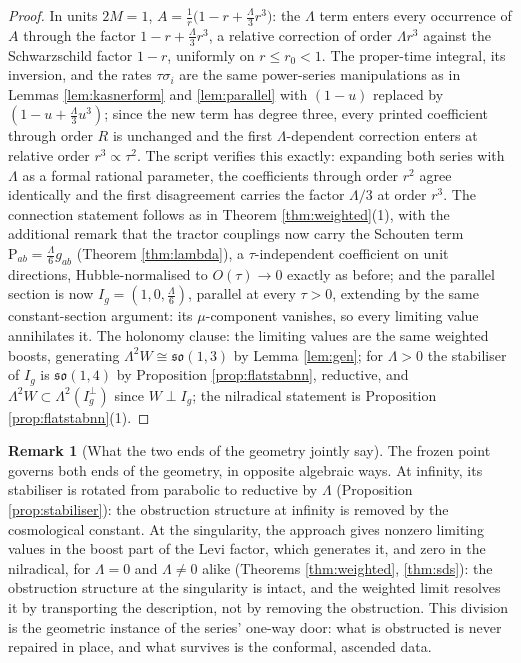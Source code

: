 \documentclass[11pt]{article}
\theoremstyle{definition}
\newtheorem{remark}[theorem]{Remark}
\newcommand{\Sch}{\mathrm{P}}
\begin{document}
\begin{proof}
In units $2M = 1$, $A = \tfrac{1}{r}\bigl(1 - r + \tfrac{\Lambda}{3}r^3\bigr)$: the $\Lambda$ term enters every occurrence of $A$ through the factor $1 - r + \tfrac{\Lambda}{3}r^3$, a relative correction of order $\Lambda r^3$ against the Schwarzschild factor $1 - r$, uniformly on $r \le r_0 < 1$. The proper-time integral, its inversion, and the rates $\tau\sigma_i$ are the same power-series manipulations as in Lemmas \ref{lem:kasnerform} and \ref{lem:parallel} with $(1-u)$ replaced by $(1 - u + \tfrac{\Lambda}{3}u^3)$; since the new term has degree three, every printed coefficient through order $R$ is unchanged and the first $\Lambda$-dependent correction enters at relative order $r^3 \propto \tau^2$. The script verifies this exactly: expanding both series with $\Lambda$ as a formal rational parameter, the coefficients through order $r^{2}$ agree identically and the first disagreement carries the factor $\Lambda/3$ at order $r^3$. The connection statement follows as in Theorem \ref{thm:weighted}(1), with the additional remark that the tractor couplings now carry the Schouten term $\Sch_{ab} = \tfrac{\Lambda}{6}g_{ab}$ (Theorem \ref{thm:lambda}), a $\tau$-independent coefficient on unit directions, Hubble-normalised to $O(\tau) \to 0$ exactly as before; and the parallel section is now $I_g = (1, 0, \tfrac{\Lambda}{6})$, parallel at every $\tau > 0$, extending by the same constant-section argument: its $\mu$-component vanishes, so every limiting value annihilates it. The holonomy clause: the limiting values are the same weighted boosts, generating $\Lambda^2 W \cong \mathfrak{so}(1,3)$ by Lemma \ref{lem:gen}; for $\Lambda > 0$ the stabiliser of $I_g$ is $\mathfrak{so}(1,4)$ by Proposition \ref{prop:flatstabnn}, reductive, and $\Lambda^2 W \subset \Lambda^2(I_g^\perp)$ since $W \perp I_g$; the nilradical statement is Proposition \ref{prop:flatstabnn}(1).
\end{proof}

\begin{remark}[What the two ends of the geometry jointly say]\label{rem:jointly}
The frozen point governs both ends of the geometry, in opposite algebraic ways. At infinity, its stabiliser is rotated from parabolic to reductive by $\Lambda$ (Proposition \ref{prop:stabiliser}): the obstruction structure at infinity is removed by the cosmological constant. At the singularity, the approach gives nonzero limiting values in the boost part of the Levi factor, which generates it, and zero in the nilradical, for $\Lambda = 0$ and $\Lambda \neq 0$ alike (Theorems \ref{thm:weighted}, \ref{thm:sds}): the obstruction structure at the singularity is intact, and the weighted limit resolves it by transporting the description, not by removing the obstruction. This division is the geometric instance of the series' one-way door: what is obstructed is never repaired in place, and what survives is the conformal, ascended data.
\end{remark}
\end{document}

